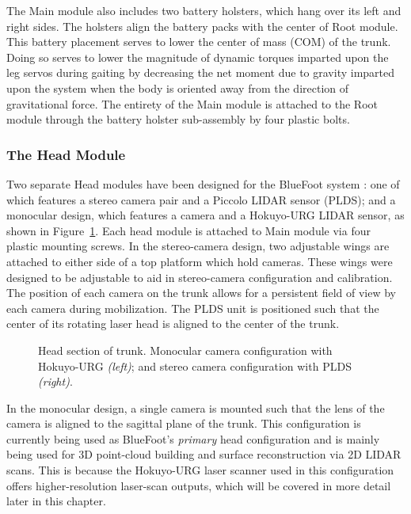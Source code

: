 			
				The Main module also includes two battery holsters, which hang over its left and right sides. The holsters align the battery packs with the center of Root module. This battery placement serves to lower the center of mass (COM) of the trunk. Doing so serves to lower the magnitude of dynamic torques imparted upon the leg servos during gaiting by decreasing the net moment due to gravity imparted upon the system when the body is oriented away from the direction of gravitational force. The entirety of the Main module is attached to the Root module through the battery holster sub-assembly by four plastic bolts.
		
			\subsubsection{The Head Module}

				Two separate Head modules have been designed for the BlueFoot system : one of which features a stereo camera pair and a Piccolo LIDAR sensor (PLDS); and a monocular design, which features a camera and a Hokuyo-URG LIDAR sensor, as shown in Figure~\ref{fig::head_module}. Each head module is attached to Main module via four plastic mounting screws. In the stereo-camera design, two adjustable wings are attached to either side of a top platform which hold cameras. These wings were designed to be adjustable to aid in stereo-camera configuration and calibration. The position of each camera on the trunk allows for a persistent field of view by each camera during mobilization. The PLDS unit is positioned such that the center of its rotating laser head is aligned to the center of the trunk. 

				\begin{figure}[h!]
					\centering
					\caption{Head section of trunk. Monocular camera configuration with Hokuyo-URG \emph{(left)}; and stereo  camera configuration with PLDS \emph{(right)}. }
					\label{fig::head_module}
				\end{figure}		

				In the monocular design, a single camera is mounted such that the lens of the camera is aligned to the sagittal plane of the trunk. This configuration is currently being used as BlueFoot's \emph{primary} head configuration and is mainly being used for 3D point-cloud building and surface reconstruction via 2D LIDAR scans. This is because the Hokuyo-URG laser scanner used in this configuration offers higher-resolution laser-scan outputs, which will be covered in more detail later in this chapter.

